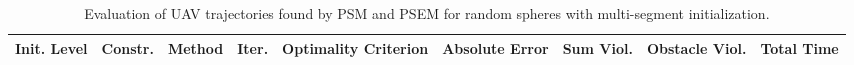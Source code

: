 \begin{table}
\small

\caption{Evaluation of UAV trajectories found by PSM and PSEM for random spheres with multi-segment initialization.}
\label{tab:traj-plan-eval-random_spheres-multi}
\begin{tabular}{p{21mm}p{9mm}p{12mm}p{6mm}p{14mm}p{14mm}p{14mm}p{14mm}p{14mm}}
\toprule
Init. Level & Constr. & Method & Iter. & Optimality Criterion & Absolute Error & Sum Viol. & Obstacle Viol. & Total Time \\
\midrule
\bottomrule
\end{tabular}
\end{table}
